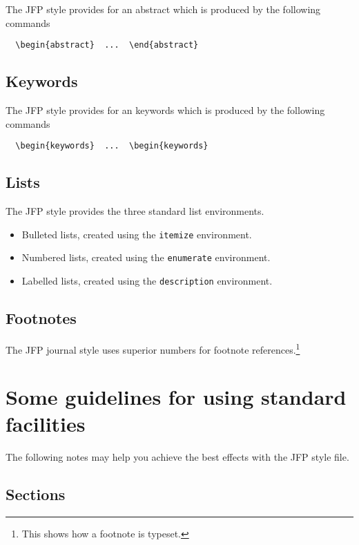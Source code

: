 \documentclass{jfp}
\begin{document}
The JFP style provides for an abstract which is produced by the following
commands
%
\begin{verbatim}
  \begin{abstract}  ...  \end{abstract}
\end{verbatim}

\subsection{Keywords}

The JFP style provides for an keywords which is produced by the following
commands
%
\begin{verbatim}
  \begin{keywords}  ...  \begin{keywords}
\end{verbatim}

\subsection{Lists}

The JFP style provides the three standard list environments.
\begin{itemize}
  \item Bulleted lists, created using the \verb"itemize" environment.
  \item Numbered lists, created using the \verb"enumerate" environment.
  \item Labelled lists, created using the \verb"description" environment.
\end{itemize}

\subsection{Footnotes}

The JFP journal style uses superior numbers for footnote
references.\footnote{This shows how a footnote is typeset.}

\section{Some guidelines for using standard facilities}

The following notes may help you achieve the best effects with the JFP style
file.

\subsection{Sections}
\end{document}
